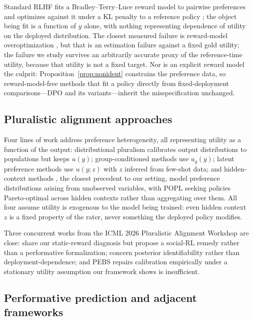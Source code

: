 ﻿\documentclass[11pt]{article}
\begin{document}
Standard RLHF fits a Bradley--Terry--Luce reward model to pairwise preferences and optimizes against it under a KL penalty to a reference policy \citep{bradley1952, christiano2017, ouyang2022}; the object being fit is a function of \(y\) alone, with nothing representing dependence of utility on the deployed distribution. The closest measured failure is reward-model overoptimization \citep{gao2023}, but that is an estimation failure against a fixed gold utility; the failure we study survives an arbitrarily accurate proxy of the reference-time utility, because that utility is not a fixed target. Nor is an explicit reward model the culprit: Proposition~\ref{prop:nonident} constrains the preference data, so reward-model-free methods that fit a policy directly from fixed-deployment comparisons---DPO \citep{rafailov2023} and its variants---inherit the misspecification unchanged.

\subsection{Pluralistic alignment approaches}

Four lines of work address preference heterogeneity, all representing utility as a function of the output: distributional pluralism \citep{sorensen2024} calibrates output distributions to populations but keeps \(u(y)\); group-conditioned methods \citep{chakraborty2024, chen2025} use \(u_g(y)\); latent preference methods \citep{poddar2024} use \(u(y; z)\) with \(z\) inferred from few-shot data; and hidden-context methods \citep{siththaranjan2024}, the closest precedent to our setting, model preference distributions arising from unobserved variables, with POPL \citep{bahlous2024} seeking policies Pareto-optimal across hidden contexts rather than aggregating over them. All four assume utility is exogenous to the model being trained: even hidden context \(z\) is a fixed property of the rater, never something the deployed policy modifies.

Three concurrent works from the ICML 2026 Pluralistic Alignment Workshop are close: \citet{ghasemi2026} share our static-reward diagnosis but propose a social-RL remedy rather than a performative formalization; \citet{lin2026} concern posterior identifiability rather than deployment-dependence; and PEBS \citep{raj2026} repairs calibration empirically under a stationary utility assumption our framework shows is insufficient.

\subsection{Performative prediction and adjacent frameworks}
\end{document}
